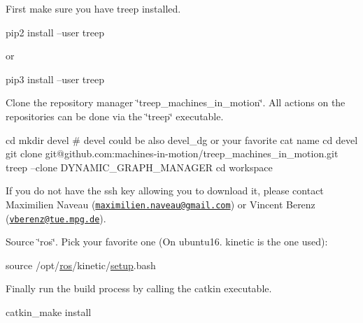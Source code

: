 \begin{DoxyEnumerate}
\item First make sure you have treep installed. 
\begin{DoxyCode}
pip2 install --user treep
\end{DoxyCode}
 or 
\begin{DoxyCode}
pip3 install --user treep
\end{DoxyCode}

\item Clone the repository manager \char`\"{}treep\+\_\+machines\+\_\+in\+\_\+motion\char`\"{}. All actions on the repositories can be done via the \char`\"{}treep\char`\"{} executable. 
\begin{DoxyCode}
cd
mkdir devel # devel could be also devel\_dg or your favorite cat name
cd devel
git clone git@github.com:machines-in-motion/treep\_machines\_in\_motion.git
treep --clone DYNAMIC\_GRAPH\_MANAGER
cd workspace
\end{DoxyCode}
 If you do not have the ssh key allowing you to download it, please contact Maximilien Naveau (\href{mailto:maximilien.naveau@gmail.com}{\tt maximilien.\+naveau@gmail.\+com}) or Vincent Berenz (\href{mailto:vberenz@tue.mpg.de}{\tt vberenz@tue.\+mpg.\+de}).
\item Source \char`\"{}ros\char`\"{}. Pick your favorite one (On ubuntu16. kinetic is the one used)\+: 
\begin{DoxyCode}
source /opt/\hyperlink{namespaceros}{ros}/kinetic/\hyperlink{namespacesetup}{setup}.bash
\end{DoxyCode}

\item Finally run the build process by calling the catkin executable. 
\begin{DoxyCode}
catkin\_make install
\end{DoxyCode}
 
\end{DoxyEnumerate}